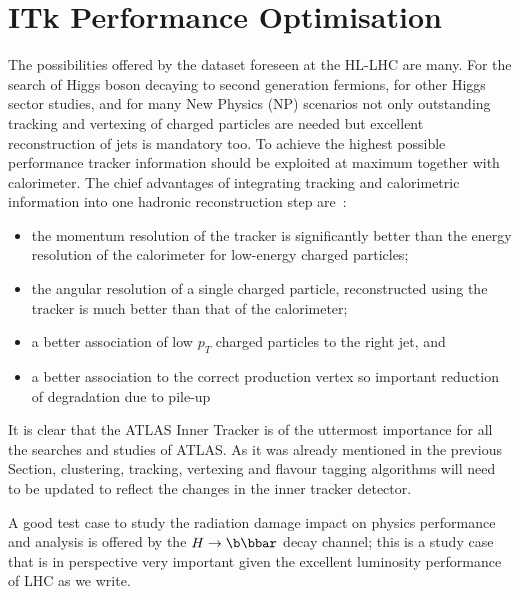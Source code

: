 \section{ITk Performance Optimisation}
\label{sec:algos}

The possibilities offered by the dataset foreseen at the HL-LHC are many. 
For the search of Higgs boson decaying to second generation fermions, for other Higgs sector 
studies, and for many New Physics (NP) scenarios not only outstanding tracking and vertexing of charged 
particles are needed but  excellent reconstruction of jets is mandatory  too. 
To achieve the highest possible performance tracker information should be exploited at maximum 
together with calorimeter. 
The chief advantages of integrating tracking and calorimetric information into one hadronic reconstruction
step are~\cite{ATLASParticleFlow}:
\begin{itemize}
\item the momentum resolution of the tracker is significantly better than the energy resolution of the
calorimeter for low-energy charged particles;
\item the angular resolution of a single charged particle, reconstructed using the tracker is much better
than that of the calorimeter;
\item a better association of low $p_T$ charged particles to the right jet, and
\item a better association to the correct production vertex so important reduction of degradation due to pile-up  
\end{itemize}
It is clear that the ATLAS Inner Tracker is of the uttermost importance for all
the searches and studies of ATLAS. 
As it was already mentioned in the previous Section, clustering, tracking, vertexing and flavour tagging 
algorithms will need to be updated to reflect the changes in the inner tracker detector.

A good  test case to 
study the radiation damage impact  on physics  performance and analysis is offered by 
the $H\to\b\bbar$ decay channel; 
this is a study case that is in 
perspective very important given the excellent luminosity performance of LHC as we write.

